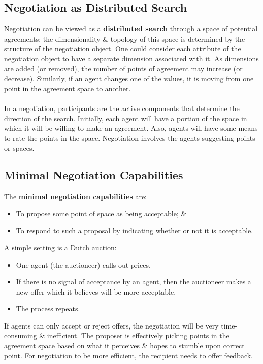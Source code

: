 \documentclass[a4paper,11pt]{article}
\begin{document}
\subsection{Negotiation as Distributed Search}
Negotiation can be viewed as a \textbf{distributed search} through a space of potential agreements;
the dimensionality \& topology of this space is determined by the structure of the negotiation object.
One could consider each attribute of the negotiation object to have a separate dimension associated with it.
As dimensions are added (or removed), the number of points of agreement may increase (or decrease).
Similarly, if an agent changes one of the values, it is moving from one point in the agreement space to another.
\\\\
In a negotiation, participants are the active components that determine the direction of the search.
Initially, each agent will have a portion of the space in which it will be willing to make an agreement.
Also, agents will have some means to rate the points in the space.
Negotiation involves the agents suggesting points or spaces.

\subsection{Minimal Negotiation Capabilities}
The \textbf{minimal negotiation capabilities} are:
\begin{itemize}
    \item   To propose some point of space as being acceptable; \& 
    \item   To respond to such a proposal by indicating whether or not it is acceptable.
\end{itemize}

A simple setting is a Dutch auction:
\begin{itemize}
    \item   One agent (the auctioneer) calls out prices.
    \item   If there is no signal of acceptance by an agent, then the auctioneer makes a new offer which it believes will be more acceptable.
    \item   The process repeats.
\end{itemize}

If agents can only accept or reject offers, the negotiation will be very time-consuming \& inefficient.
The proposer is effectively picking points in the agreement space based on what it perceives \& hopes to stumble upon correct point. 
For negotiation to be more efficient, the recipient needs to offer feedback.
\end{document}
